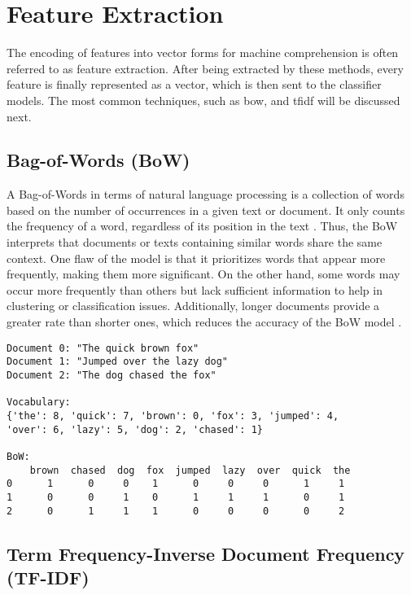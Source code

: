 \section{Feature Extraction}

The encoding of features into vector forms for machine comprehension is often referred to as feature extraction. After being extracted by these methods, every feature is finally represented as a vector, which is then sent to the classifier models. The most common techniques, such as \ac{bow}, and \ac{tfidf} will be discussed next.

\subsection{Bag-of-Words (BoW)}

A Bag-of-Words in terms of natural language processing is a collection of words based on the number of occurrences in a given text or document. It only counts the frequency of a word, regardless of its position in the text \citep{tabassum_survey_2020}. Thus, the BoW interprets that documents or texts containing similar words share the same context. One flaw of the model is that it prioritizes words that appear more frequently, making them more significant. On the other hand, some words may occur more frequently than others but lack sufficient information to help in clustering or classification issues. Additionally, longer documents provide a greater rate than shorter ones, which reduces the accuracy of the BoW model \citep{tabassum_survey_2020}.

\begin{verbatim}
Document 0: "The quick brown fox"
Document 1: "Jumped over the lazy dog"
Document 2: "The dog chased the fox"

Vocabulary: 
{'the': 8, 'quick': 7, 'brown': 0, 'fox': 3, 'jumped': 4,
'over': 6, 'lazy': 5, 'dog': 2, 'chased': 1}

BoW:
    brown  chased  dog  fox  jumped  lazy  over  quick  the
0      1      0     0    1      0     0     0      1     1
1      0      0     1    0      1     1     1      0     1
2      0      1     1    1      0     0     0      0     2
\end{verbatim}


\subsection{Term Frequency-Inverse Document Frequency (TF-IDF)}

